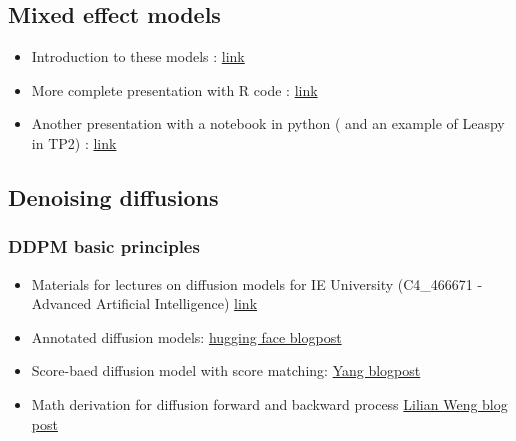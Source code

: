 \documentclass{article}
\begin{document}
\subsection{Mixed effect models}

\begin{itemize} 
 \item Introduction to these models : \href{https://stats.oarc.ucla.edu/other/mult-pkg/introduction-to-linear-mixed-models/}{link}

\item More complete  presentation with R code : \href{https://cambiotraining.github.io/stats-mixed-effects-models/materials/03-independence-psuedoreplication.html}{link}

\item Another  presentation with a notebook in python ( and an example of Leaspy in  TP2) : \href{https://disease-progression-modelling.github.io/pages/notebooks/disease_course_mapping/TP1_LMM.html}{link}

\end{itemize}



\subsection{Denoising diffusions}
\subsubsection{DDPM basic principles}

\begin{itemize}

    \item Materials for lectures on diffusion models for IE University (C4\_466671 - Advanced Artificial Intelligence) \href{https://julioasotodv.github.io/ie-c4-466671-diffusion-models/about.html}{link}
    
    \item Annotated diffusion models: \href{https://colab.research.google.com/github/huggingface/notebooks/blob/main/examples/annotated_diffusion.ipynb#scrollTo=b02eb802}{hugging face blogpost}
    
    \item Score-baed diffusion model with score matching: \href{https://yang-song.net/blog/2021/score/}{Yang blogpost}

    \item Math derivation for diffusion forward and backward process \href{https://lilianweng.github.io/posts/2021-07-11-diffusion-models/}{Lilian Weng blog post}
\end{itemize}
\end{document}
